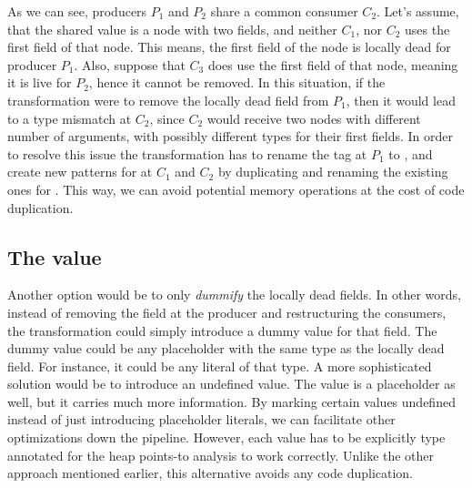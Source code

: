 \documentclass[main.tex]{subfiles}
\begin{document}
	As we can see, producers $P_1$ and $P_2$ share a common consumer $C_2$. Let's assume, that the shared value is a  node with two fields, and neither $C_1$, nor $C_2$ uses the first field of that node. This means, the first field of the  node is locally dead for producer $P_1$. Also, suppose that $C_3$ does use the first field of that node, meaning it is live for $P_2$, hence it cannot be removed. In this situation, if the transformation were to remove the locally dead field from $P_1$, then it would lead to a type mismatch at $C_2$, since $C_2$ would receive two  nodes with different number of arguments, with possibly different types for their first fields. In order to resolve this issue the transformation has to rename the tag at $P_1$ to , and create new patterns for  at $C_1$ and $C_2$ by duplicating and renaming the existing ones for . This way, we can avoid potential memory operations at the cost of code duplication.
	
	\subsection{The  value}
	
	Another option would be to only \emph{dummify} the locally dead fields. In other words, instead of removing the field at the producer and restructuring the consumers, the transformation could simply introduce a dummy value for that field. The dummy value could be any placeholder with the same type as the locally dead field. For instance, it could be any literal of that type. A more sophisticated solution would be to introduce an undefined value. The  value is a placeholder as well, but it carries much more information. By marking certain values undefined instead of just introducing placeholder literals, we can facilitate other optimizations down the pipeline. However, each  value has to be explicitly type annotated for the heap points-to analysis to work correctly. Unlike the other approach mentioned earlier, this alternative avoids any code duplication.
	
\end{document}
